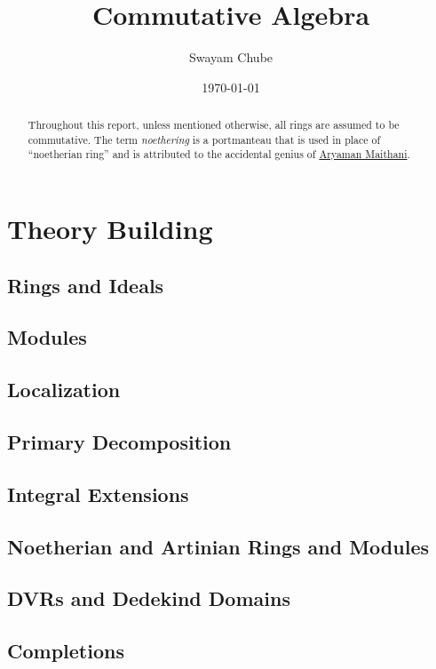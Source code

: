 \documentclass{report}
\title{Commutative Algebra}
\author{Swayam Chube}
\date{\today}
\begin{document}
\maketitle

\begin{abstract}
    Throughout this report, unless mentioned otherwise, all rings are assumed to be commutative. The term \textit{noethering} is a portmanteau that is used in place of ``noetherian ring'' and is attributed to the accidental genius of \href{https://youtu.be/RrjJfyEF7Ak?t=1259}{Aryaman Maithani}.
\end{abstract}

\tableofcontents


\part{Theory Building}
\chapter{Rings and Ideals}


\chapter{Modules}


\chapter{Localization}


\chapter{Primary Decomposition}


\chapter{Integral Extensions}


\chapter{Noetherian and Artinian Rings and Modules}


\chapter{DVRs and Dedekind Domains}

\chapter{Completions}


% 

% 
% 
\end{document}
